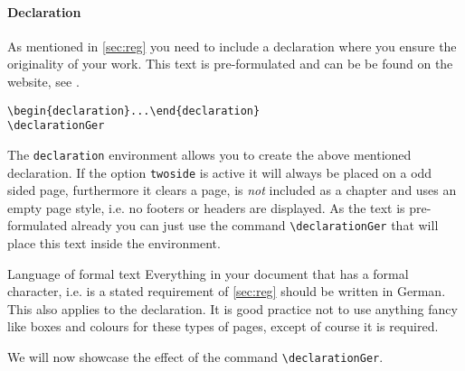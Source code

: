 \paragraph{Declaration}\label{par:decla} As mentioned in \cref{sec:reg} you need to include 
a declaration where you ensure the originality of your work. This text is pre-formulated 
and can be be found on the website, see \cite{FAUreg}.
\begin{emphBox}
\lstinline|\begin{declaration}...\end{declaration}|\\
\lstinline|\declarationGer|
\end{emphBox}
The \lstinline|declaration| environment allows you to create the above mentioned 
declaration. If the option \lstinline|twoside| is active it will always be placed on a odd 
sided page, furthermore it clears a page, is \emph{not} included as a chapter and uses an 
empty page style, i.e. no footers or headers are displayed. 
As the text is pre-formulated already you can just use the command \lstinline|\declarationGer| 
that will place this text inside the environment. 
\begin{memo}{Language of formal text}
Everything in your document that has a formal character, i.e. is a stated requirement of 
\cref{sec:reg} should be written in German. This also applies to the declaration. 
It is good practice not to use anything fancy like boxes and colours for these types of 
pages, except of course it is required. 
\end{memo}
We will now showcase the effect of the command \lstinline|\declarationGer|.
\declarationGer
